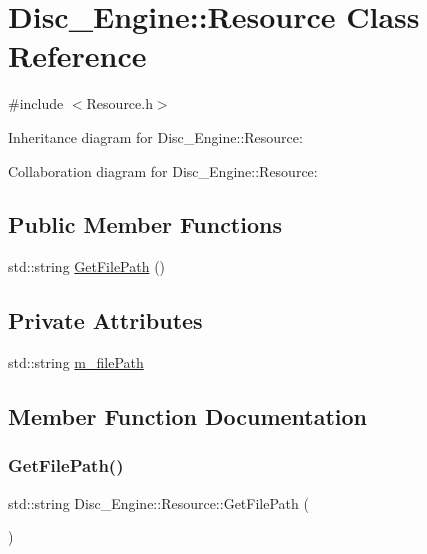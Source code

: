\hypertarget{class_disc___engine_1_1_resource}{}\section{Disc\+\_\+\+Engine\+:\+:Resource Class Reference}
\label{class_disc___engine_1_1_resource}


{\ttfamily \#include $<$Resource.\+h$>$}



Inheritance diagram for Disc\+\_\+\+Engine\+:\+:Resource\+:


Collaboration diagram for Disc\+\_\+\+Engine\+:\+:Resource\+:
\subsection*{Public Member Functions}
\begin{DoxyCompactItemize}
\item 
std\+::string \mbox{\hyperlink{class_disc___engine_1_1_resource_a2a42760b1d425e4503157a222d5dcc99}{Get\+File\+Path}} ()
\end{DoxyCompactItemize}
\subsection*{Private Attributes}
\begin{DoxyCompactItemize}
\item 
std\+::string \mbox{\hyperlink{class_disc___engine_1_1_resource_ae1fa22cdaf1982bcbf47adfc2383d831}{m\+\_\+file\+Path}}
\end{DoxyCompactItemize}


\subsection{Member Function Documentation}
\mbox{\label{class_disc___engine_1_1_resource_a2a42760b1d425e4503157a222d5dcc99}} 
\subsubsection{\texorpdfstring{Get\+File\+Path()}{GetFilePath()}}
{\footnotesize\ttfamily std\+::string Disc\+\_\+\+Engine\+::\+Resource\+::\+Get\+File\+Path (\begin{DoxyParamCaption}{ }\end{DoxyParamCaption})\hspace{0.3cm}{\ttfamily [inline]}}



